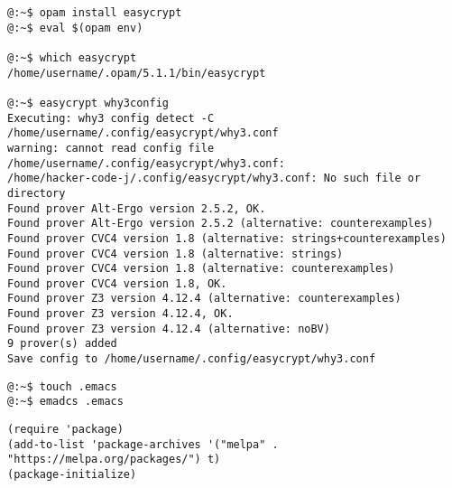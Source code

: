 \begin{lstlisting}[style=normal]
@:~$ opam install easycrypt
@:~$ eval $(opam env)

@:~$ which easycrypt
/home/username/.opam/5.1.1/bin/easycrypt

@:~$ easycrypt why3config
Executing: why3 config detect -C /home/username/.config/easycrypt/why3.conf
warning: cannot read config file /home/username/.config/easycrypt/why3.conf:
/home/hacker-code-j/.config/easycrypt/why3.conf: No such file or directory
Found prover Alt-Ergo version 2.5.2, OK.
Found prover Alt-Ergo version 2.5.2 (alternative: counterexamples)
Found prover CVC4 version 1.8 (alternative: strings+counterexamples)
Found prover CVC4 version 1.8 (alternative: strings)
Found prover CVC4 version 1.8 (alternative: counterexamples)
Found prover CVC4 version 1.8, OK.
Found prover Z3 version 4.12.4 (alternative: counterexamples)
Found prover Z3 version 4.12.4, OK.
Found prover Z3 version 4.12.4 (alternative: noBV)
9 prover(s) added
Save config to /home/username/.config/easycrypt/why3.conf
\end{lstlisting}


\begin{lstlisting}[style=normal]
@:~$ touch .emacs
@:~$ emadcs .emacs
\end{lstlisting}
\begin{lstlisting}[style=normal]
(require 'package)
(add-to-list 'package-archives '("melpa" . "https://melpa.org/packages/") t)
(package-initialize)
\end{lstlisting}


\newpage
